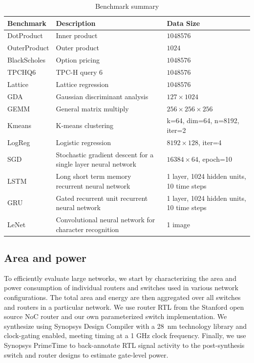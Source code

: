 \begin{table}
\centering
  \footnotesize
  \begin{tabular*}{6.25in}{p{0.75in} p{3in} p{2.5in}}
    \bottomrule
    \textbf{Benchmark} & \textbf{Description} & \textbf{Data Size} \\ \midrule
    DotProduct & Inner product & $1048576$ \\ \midrule
    OuterProduct & Outer product &$1024$ \\ \midrule
    BlackScholes & Option pricing &$1048576$ \\ \midrule
    TPCHQ6 & TPC-H query 6 &$1048576$ \\ \midrule
    Lattice & Lattice regression~\cite{garcia2009lattice} &$1048576$\\ \midrule
    GDA & Gaussian discriminant analysis &$127\times1024$ \\ \midrule
    GEMM & General matrix multiply &$256\times256\times256$ \\ \midrule
    Kmeans & K-means clustering &k=64, dim=64, n=8192, iter=2 \\ \midrule
    LogReg & Logistic regression &$8192\times128$, iter=4\\ \midrule
    SGD & Stochastic gradient descent for a single layer neural network &$16384\times64$, epoch=10 \\ \midrule
    LSTM & Long short term memory recurrent neural network &1 layer, 1024 hidden units, 10 time steps \\ \midrule
    GRU & Gated recurrent unit recurrent neural network &1 layer, 1024 hidden units, 10 time steps \\ \midrule
    LeNet & Convolutional neural network for character recognition& 1 image\\ \midrule
  \end{tabular*}
  \caption{Benchmark summary}
  \label{tab:benchmark}
\end{table}


\subsection{Area and power}
To efficiently evaluate large networks, we start by characterizing the area and power consumption of individual routers and switches
used in various network configurations. 
The total area and energy are then aggregated over all switches and routers in a particular network.
We use router RTL from the Stanford open source NoC router \cite{becker2012efficient} and our own parameterized switch implementation.
We synthesize using Synopsys Design Compiler with a \SI{28}{nm} technology library and clock-gating enabled, meeting timing at a 1 GHz clock frequency.
Finally, we use Synopsys PrimeTime to back-annotate RTL signal activity to the post-synthesis switch and router designs to estimate gate-level power.

